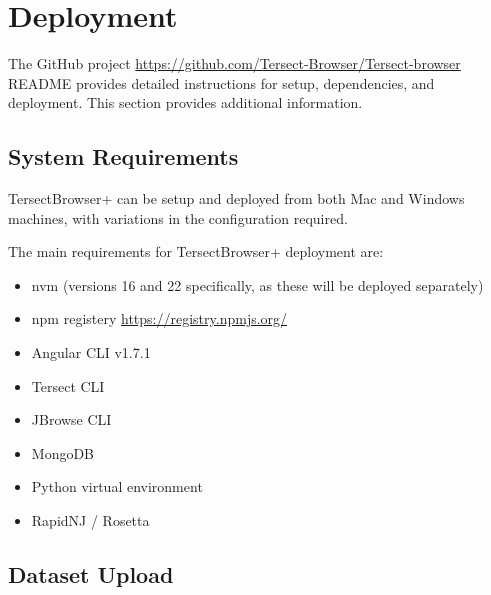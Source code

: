 \documentclass[12pt]{article}
\begin{document}
\section{Deployment}
The GitHub project \url{https://github.com/Tersect-Browser/Tersect-browser} README provides detailed instructions for setup, dependencies, and deployment. This section provides additional information. 


\subsection{System Requirements}
TersectBrowser+ can be setup and deployed from both Mac and Windows machines, with variations in the configuration required. 

The main requirements for TersectBrowser+ deployment are:
\begin{itemize}
    \item nvm (versions 16 and 22 specifically, as these will be deployed separately)
    \item npm registery \url{https://registry.npmjs.org/}
    \item Angular CLI v1.7.1
    \item Tersect CLI
    \item JBrowse CLI
    \item MongoDB
    \item Python virtual environment
    \item RapidNJ / Rosetta
\end{itemize}

\subsection{Dataset Upload}
\end{document}
